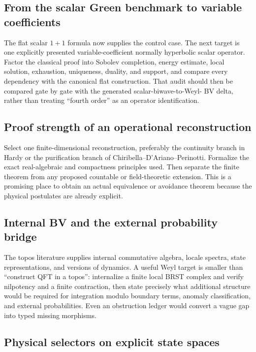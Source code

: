 \documentclass[11pt]{article}
\theoremstyle{definition}
\theoremstyle{remark}
\begin{document}
\subsection{From the scalar Green benchmark to variable coefficients}

The flat scalar \(1+1\) formula now supplies the control case.  The next target
is one explicitly presented variable-coefficient normally hyperbolic scalar
operator.  Factor the classical proof into Sobolev completion, energy
estimate, local solution, exhaustion, uniqueness, duality, and support, and
compare every dependency with the canonical flat construction.  That audit
should then be compared gate by gate with the generated scalar-biwave-to-Weyl-
BV delta, rather than treating ``fourth order'' as an operator identification.

\subsection{Proof strength of an operational reconstruction}

Select one finite-dimensional reconstruction, preferably the continuity
branch in Hardy or the purification branch of Chiribella--D'Ariano--Perinotti.
Formalize the exact real-algebraic and compactness principles used.  Then
separate the finite theorem from any proposed countable or field-theoretic
extension.  This is a promising place to obtain an actual equivalence or
avoidance theorem because the physical postulates are already explicit.

\subsection{Internal BV and the external probability bridge}

The topos literature supplies internal commutative algebra, locale spectra,
state representations, and versions of dynamics.  A useful Weyl target is
smaller than ``construct QFT in a topos'': internalize a finite local BRST
complex and verify nilpotency and a finite contraction, then state precisely
what additional structure would be required for integration modulo boundary
terms, anomaly classification, and external probabilities.  Even an
obstruction ledger would convert a vague gap into typed missing morphisms.

\subsection{Physical selectors on explicit state spaces}
\end{document}
